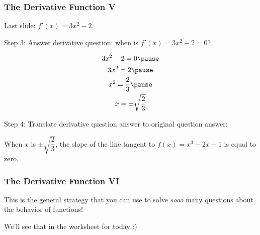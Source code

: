 \documentclass{ltx-talk}
\begin{document}
\begin{frame}
  \frametitle{The Derivative Function V}
  Last slide: $f'(x) = 3x^2 - 2$. \pause

  Step 3: Answer derivative question: \pause when is $f'(x) = 3x^2 - 2 = 0$? \pause

  \begin{gather}
    3x^2 - 2 = 0 \pause \\
    3x^2 = 2 \pause \\
    x^2 = \dfrac{2}{3} \pause \\
    x = \pm \sqrt{\dfrac{2}{3}}
  \end{gather} \pause

  Step 4: Translate derivative question answer to original question answer: \pause

  \begin{center}
    When $x$ is $\pm \sqrt{\dfrac{2}{3}}$, the slope of the line tangent to $f(x) = x^3 - 2x + 1$ is equal to zero.
  \end{center}
\end{frame}

\begin{frame}
  \frametitle{The Derivative Function VI}

  This is the general strategy that you can use to solve \textit{sooo} many questions about the behavior of functions! \pause

  We'll see that in the worksheet for today :)
\end{frame}
\end{document}
